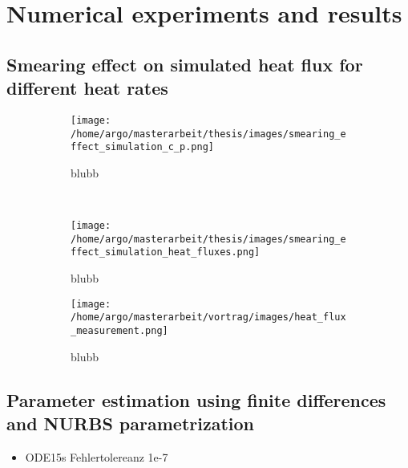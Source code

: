 \documentclass{scrartcl}[12pt, halfparskip]
\begin{document}
\section{Numerical experiments and results}


\subsection{Smearing effect on simulated heat flux for different heat rates}


\begin{figure}[H]
	\centering
	\begin{subfigure}{0.49\textwidth}
		\texttt{[image: /home/argo/masterarbeit/thesis/images/smearing\_effect\_simulation\_c\_p.png]}
		\caption{blubb}
		\label{fig:smearing_effect_c_p}
	\end{subfigure} \\
	\begin{subfigure}{0.49\textwidth}
		\texttt{[image: /home/argo/masterarbeit/thesis/images/smearing\_effect\_simulation\_heat\_fluxes.png]}
		\caption{blubb}
		\label{fig:smearing_effect_simulation_heat_flux}
	\end{subfigure}
	\begin{subfigure}{0.49\textwidth}
		\texttt{[image: /home/argo/masterarbeit/vortrag/images/heat\_flux\_measurement.png]}
		\caption{blubb}
		\label{fig:smearing_effect_measurement_heat_flux}
	\end{subfigure}
	\caption{}
\end{figure}




\subsection{Parameter estimation using finite differences and NURBS parametrization}

\begin{itemize}
	\item ODE15s Fehlertolereanz 1e-7
\end{itemize}
\end{document}
